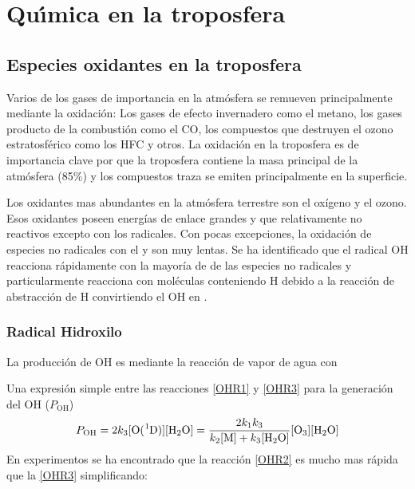 %  
%  

\chapter[Quimica en la Troposfera]{Qu\'{\i}mica en la troposfera}

\section{Especies oxidantes en la troposfera}
Varios de los gases de importancia en la atmósfera se remueven principalmente mediante la oxidación: Los gases de efecto invernadero como el metano, los gases producto de la combustión como el CO, los compuestos que destruyen el ozono estratosférico como los HFC y otros. La oxidación en la troposfera es de importancia clave por que la troposfera contiene la masa principal de la atmósfera (85\%) y los compuestos traza se emiten principalmente en la superficie.

Los oxidantes mas abundantes en la atmósfera terrestre son el oxígeno y el ozono. Esos oxidantes poseen energías de enlace grandes y que relativamente no reactivos excepto con los radicales. Con pocas excepciones, la oxidación de especies no radicales con el  y  son muy lentas. Se ha identificado que el radical OH reacciona rápidamente con la mayoría de de las especies no radicales y particularmente reacciona con moléculas conteniendo H debido a la reacción de abstracción de H convirtiendo el OH en . 

\subsection{Radical Hidroxilo}

La producción de OH es mediante la reacción de vapor de agua con 


Una expresión simple entre las reacciones \ref{OHR1} y \ref{OHR3}  para la generación del OH  ($P_\mathrm{OH}$) 
\begin{equation}
P_\mathrm{OH}= 2k_3 [\ce{O(^1D)}] [\ce{H2O}] = \frac{2k_1k_3}{k_2[\mathrm{M]}+k_3[\ce{H2O}]} [\ce{O3}][\ce{H2O}] 
\end{equation}
En experimentos se ha encontrado que la reacción \ref{OHR2} es mucho mas rápida que la \ref{OHR3} simplificando:

